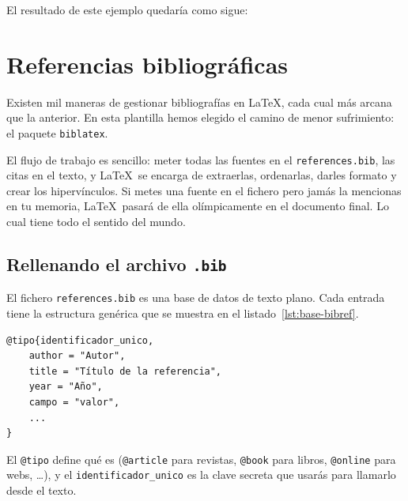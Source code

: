 El resultado de este ejemplo quedaría como sigue:


\section{Referencias bibliográficas}
\label{s:referencias-bibliograficas}

Existen mil maneras de gestionar bibliografías en \LaTeX, cada cual más arcana que la anterior. En esta plantilla hemos elegido el camino de menor sufrimiento: el paquete \texttt{biblatex}.

El flujo de trabajo es sencillo: meter todas las fuentes en el \texttt{references.bib}, las citas en el texto, y \LaTeX\ se encarga de extraerlas, ordenarlas, darles formato y crear los hipervínculos. Si metes una fuente en el fichero pero jamás la mencionas en tu memoria, \LaTeX\ pasará de ella olímpicamente en el documento final. Lo cual tiene todo el sentido del mundo.


\subsection{Rellenando el archivo \texttt{.bib}}

El fichero \texttt{references.bib} es una base de datos de texto plano. Cada entrada tiene la estructura genérica que se muestra en el listado~\ref{lst:base-bibref}.

\begin{lstlisting}[language=tex, caption=Estructura genérica de una entrada BibTeX, label=lst:base-bibref]
@tipo{identificador_unico,
    author = "Autor",
    title = "Título de la referencia",
    year = "Año",
    campo = "valor",
    ...
}
\end{lstlisting}

El \texttt{@tipo} define qué es (\texttt{@article} para revistas, \texttt{@book} para libros, \texttt{@online} para webs, \ldots), y el \texttt{identificador\_unico} es la clave secreta que usarás para llamarlo desde el texto. 


